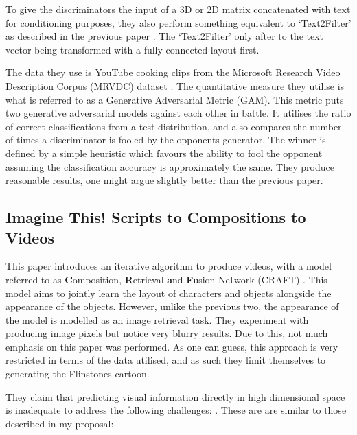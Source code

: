 \documentclass{article}
\begin{document}
To give the discriminators the input of a 3D or 2D matrix concatenated with text for conditioning purposes, they also perform something equivalent to `Text2Filter' as described in the previous paper \cite{li_video_2017,pan_create_2018}. The `Text2Filter' only after to the text vector being transformed with a fully connected layout first.

The data they use is YouTube cooking clips from the Microsoft Research Video Description Corpus (MRVDC) dataset \cite{noauthor_microsoft_nodate}. The quantitative measure they utilise is what is referred to as a Generative Adversarial Metric (GAM). This metric puts two generative adversarial models against each other in battle. It utilises the ratio of correct classifications from a test distribution, and also compares the number of times a discriminator is fooled by the opponents generator. The winner is defined by a simple heuristic which favours the ability to fool the opponent assuming the classification accuracy is approximately the same. They produce reasonable results, one might argue slightly better than the previous paper.

\subsection{Imagine This! Scripts to Compositions to Videos}

This paper introduces an iterative algorithm to produce videos, with a model referred to as \textbf{C}omposition, \textbf{R}etrieval \textbf{a}nd \textbf{F}usion Ne\textbf{t}work (CRAFT) \cite{gupta_imagine_2018}. This model
aims to jointly learn the layout of characters and objects alongside the appearance of the objects. However, unlike the previous two, the appearance of the model is modelled as an image retrieval task. They experiment
with producing image pixels but notice very blurry results. Due to this, not much emphasis on this paper was performed. As one can guess, this approach is very restricted in terms of the data utilised, and as such
they limit themselves to generating the Flinstones cartoon.

They claim that predicting visual information directly in high dimensional space is inadequate to address the following challenges: \cite{gupta_imagine_2018}. These are are similar to 
those described in my proposal:
\end{document}
